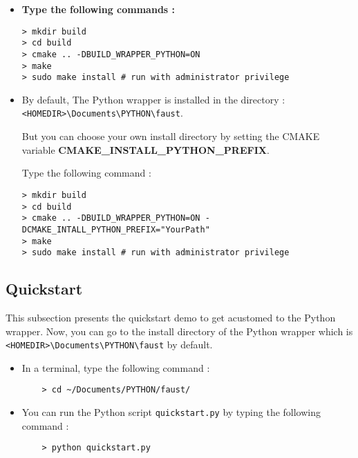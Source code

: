 \begin{itemize}
\item \textbf{Type the following commands :} 
\lstset{style=customBash}
\begin{lstlisting}
> mkdir build
> cd build
> cmake .. -DBUILD_WRAPPER_PYTHON=ON 
> make
> sudo make install # run with administrator privilege
\end{lstlisting}


\item By default,
The Python wrapper is installed in the directory : \texttt{<HOMEDIR>\textbackslash Documents\textbackslash PYTHON\textbackslash faust}.

But you can choose your own install directory by setting the \newline
CMAKE variable  \textbf{CMAKE\_INSTALL\_PYTHON\_PREFIX}.



Type the following command :
 \lstset{style=customBash}
\begin{lstlisting}
> mkdir build
> cd build
> cmake .. -DBUILD_WRAPPER_PYTHON=ON -DCMAKE_INTALL_PYTHON_PREFIX="YourPath" 
> make
> sudo make install # run with administrator privilege
\end{lstlisting}

\end{itemize}



\subsection{Quickstart}
	This subsection presents the quickstart demo to get acustomed to the Python wrapper.
	 Now, you can go to the install directory of the Python wrapper which is \newline \texttt{<HOMEDIR>\textbackslash Documents\textbackslash PYTHON\textbackslash faust} by default.
	\newline
	
	\begin{itemize}	
	\item In a terminal, type the following command :
	 \lstset{style=customBash}
	\begin{lstlisting}
	> cd ~/Documents/PYTHON/faust/
	\end{lstlisting}
	\item You can run the Python script \texttt{quickstart.py}
	by typing the following command :
	\lstset{style=customBash}
	\begin{lstlisting}
	> python quickstart.py
	\end{lstlisting}
	\end{itemize}
	
